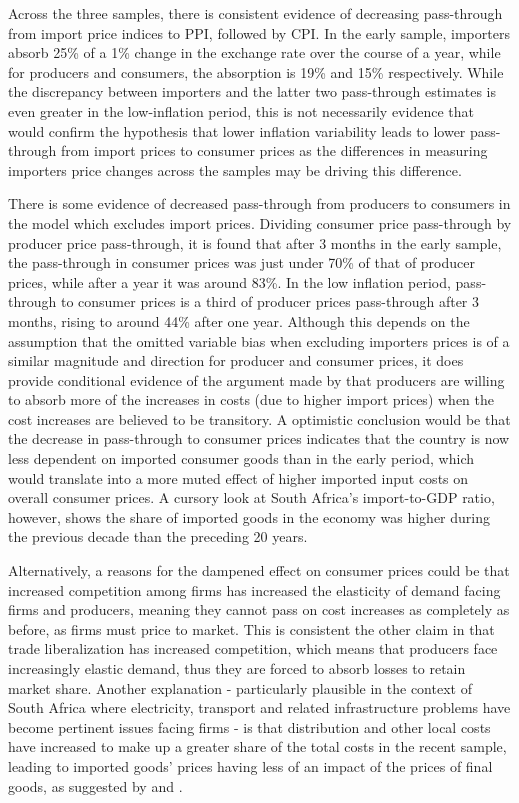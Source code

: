 \documentclass[12pt]{article}
\begin{document}
Across the three samples, there is consistent evidence of decreasing pass-through from import price indices to PPI, followed by CPI. In the early sample, importers absorb 25\% of a 1\% change in the exchange rate over the course of a year, while for producers and consumers, the absorption is 19\% and 15\% respectively. While the discrepancy between importers and the latter two pass-through estimates is even greater in the low-inflation period, this is not necessarily evidence that would confirm the hypothesis that lower inflation variability leads to lower pass-through from import prices to consumer prices as the differences in measuring importers price changes across the samples may be driving this difference.

 There is some evidence of decreased pass-through from producers to consumers in the model which excludes import prices. Dividing consumer price pass-through by producer price pass-through, it is found that after 3 months in the early sample, the pass-through in consumer prices was just under 70\% of that of producer prices, while after a year it was around 83\%. In the low inflation period, pass-through to consumer prices is a third of producer prices pass-through after 3 months, rising to around 44\% after one year. Although this depends on the assumption that the omitted variable bias when excluding importers prices is of a similar magnitude and direction for producer and consumer prices, it does provide conditional evidence of the argument made by \textcite{taylor2000low} that producers are willing to absorb more of the increases in costs (due to higher import prices) when the cost increases are believed to be transitory. A optimistic conclusion would be that the decrease in pass-through to consumer prices indicates that the country is now less dependent on imported consumer goods than in the early period, which would translate into a more muted effect of higher imported input costs on overall consumer prices. A cursory look at South Africa's import-to-GDP ratio, however, shows the share of imported goods in the economy was higher during the previous decade than the preceding 20 years.
 
 Alternatively, a reasons for the dampened effect on consumer prices could be that increased competition among firms has increased the elasticity of demand facing firms and producers, meaning they cannot pass on cost increases as completely as before, as firms must price to market. This is consistent the other claim in \textcite{taylor2000low} that trade liberalization has increased competition, which means that producers face increasingly elastic demand, thus they are forced to absorb losses to retain market share.  Another explanation - particularly plausible in the context of South Africa where electricity, transport and related infrastructure problems have become pertinent issues facing firms - is that distribution and other local costs have increased to make up a greater share of the total costs in the recent sample, leading to imported goods' prices having less of an impact of the prices of final goods, as suggested by \textcite{burstein2003distribution} and \textcite{goldberg2010sensitivity}. 
 
\end{document}
